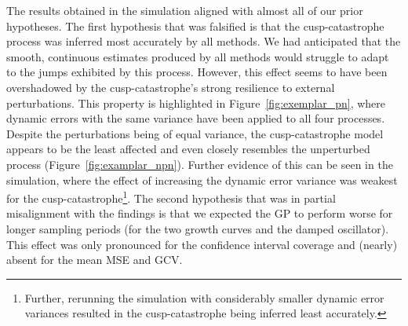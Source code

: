 \documentclass[man, floatsintext]{apa7}
\begin{document}
The results obtained in the simulation aligned with almost all of our prior
hypotheses. The first hypothesis that was falsified is that the
cusp-catastrophe process was inferred most accurately by all methods. We had
anticipated that the smooth, continuous estimates produced by all methods would
struggle to adapt to the jumps exhibited by this process. However, this effect
seems to have been overshadowed by the cusp-catastrophe's strong resilience to
external perturbations. This property is highlighted in
Figure~\ref{fig:exemplar_pn}, where dynamic errors with the same variance have
been applied to all four processes. Despite the perturbations being of equal
variance, the cusp-catastrophe model appears to be the least affected and even
closely resembles the unperturbed process (Figure~\ref{fig:examplar_npn}).
Further evidence of this can be seen in the simulation, where the effect of
increasing the dynamic error variance was weakest for the
cusp-catastrophe\footnote{Further, rerunning the simulation with considerably
  smaller dynamic error variances resulted in the cusp-catastrophe being
  inferred
  least accurately.}. The second hypothesis that was in partial misalignment
with
the findings is that we expected the GP to perform worse for longer sampling
periods (for the two growth curves and the damped oscillator). This effect was
only pronounced for the confidence interval coverage and (nearly) absent for
the mean MSE and GCV\@.
\end{document}
